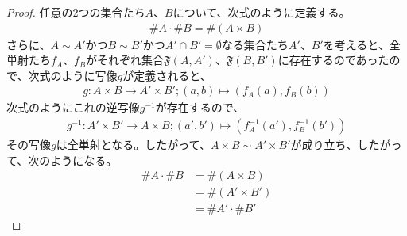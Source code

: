 \documentclass[dvipdfmx]{jsarticle}
\begin{document}
\begin{proof} 任意の2つの集合たち$A$、$B$について、次式のように定義する。
\begin{align*}
\# A \cdot \# B = \# (A \times B)
\end{align*}
さらに、$A \sim A'$かつ$B \sim B'$かつ$A' \cap B' = \emptyset $なる集合たち$A'$、$B'$を考えると、全単射たち$f_{A}$、$f_{B}$がそれぞれ集合$\mathfrak{F}\left( A,A' \right)$、$\mathfrak{F}\left( B,B' \right)$に存在するのであったので、次式のように写像$g$が定義されると、
\begin{align*}
g:A \times B \rightarrow A' \times B';(a,b) \mapsto \left( f_{A}(a),f_{B}(b) \right)
\end{align*}
次式のようにこれの逆写像$g^{- 1}$が存在するので、
\begin{align*}
g^{- 1}:A' \times B' \rightarrow A \times B;\left( a',b' \right) \mapsto \left( f_{A}^{- 1}\left( a' \right),f_{B}^{- 1}\left( b' \right) \right)
\end{align*}
その写像$g$は全単射となる。したがって、$A \times B \sim A' \times B'$が成り立ち、したがって、次のようになる。
\begin{align*}
\# A \cdot \# B &= \# (A \times B)\\
&= \# \left( A' \times B' \right)\\
&= \# A' \cdot \# B'
\end{align*}
\end{proof}
\end{document}
